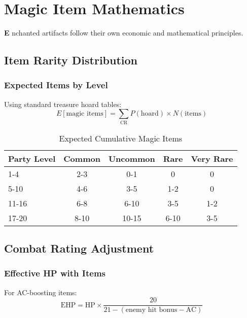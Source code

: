 \documentclass[11pt,letterpaper,openany]{book}
\newcommand{\firstletter}[1]{%
    \textcolor{bloodred}{\fontsize{48}{48}\selectfont\bfseries #1}%
}
\begin{document}
\chapter{Magic Item Mathematics}

\firstletter{E}nchanted artifacts follow their own economic and mathematical principles.

\section{Item Rarity Distribution}

\subsection{Expected Items by Level}

Using standard treasure hoard tables:
\begin{equation}
E[\text{magic items}] = \sum_{\text{CR}} P(\text{hoard}) \times N(\text{items})
\end{equation}

\begin{table}[h]
\centering
\begin{tabular}{@{}lcccc@{}}
\toprule
\textbf{Party Level} & \textbf{Common} & \textbf{Uncommon} & \textbf{Rare} & \textbf{Very Rare} \\
\midrule
1-4 & 2-3 & 0-1 & 0 & 0 \\
5-10 & 4-6 & 3-5 & 1-2 & 0 \\
11-16 & 6-8 & 6-10 & 3-5 & 1-2 \\
17-20 & 8-10 & 10-15 & 6-10 & 3-5 \\
\bottomrule
\end{tabular}
\caption{Expected Cumulative Magic Items}
\end{table}

\section{Combat Rating Adjustment}

\subsection{Effective HP with Items}

For AC-boosting items:
\begin{equation}
\text{EHP} = \text{HP} \times \frac{20}{21 - (\text{enemy hit bonus} - \text{AC})}
\end{equation}
\end{document}
